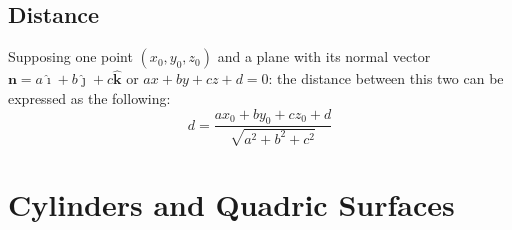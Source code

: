 \subsection{Distance}
Supposing one point $(x_0,y_0,z_0)$ and a plane with its normal vector $\bm{n}
=a\hat{\bm{\imath}}+b\hat{\bm{\jmath}}+c\hat{\bm{k}}$ or $ax+by+cz+d=0$:
the distance between this two can be expressed as the following:
\begin{equation}
\boxed{d=\frac{ax_0+by_0+cz_0+d}{\sqrt{a^2+b^2+c^2}}}
\end{equation}

\section{Cylinders and Quadric Surfaces}
